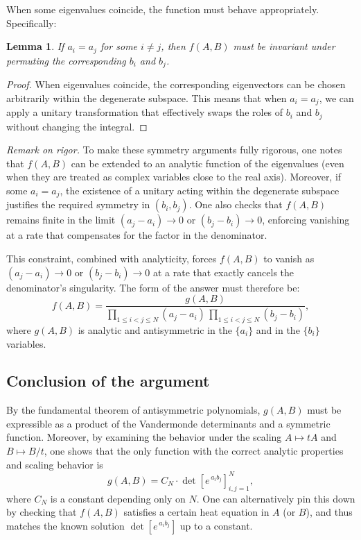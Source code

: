 \documentclass[letterpaper,11pt,oneside,reqno]{book}
\numberwithin{equation}{chapter}  %
\newtheorem{lemma}[proposition]{Lemma}
\theoremstyle{definition}
\begin{document}
When some eigenvalues coincide, the function must behave appropriately. Specifically:
\begin{lemma}
If $a_i = a_j$ for some $i \neq j$, then $f(A,B)$ must be invariant under permuting the corresponding $b_i$ and $b_j$.
\end{lemma}
\begin{proof}
When eigenvalues coincide, the corresponding eigenvectors can be chosen arbitrarily within the degenerate subspace. This means that when $a_i = a_j$, we can apply a unitary transformation that effectively swaps the roles of $b_i$ and $b_j$ without changing the integral.
\end{proof}

\textit{Remark on rigor.}
To make these symmetry arguments fully rigorous, one notes that $f(A,B)$ can be extended to an analytic function of the eigenvalues (even when they are treated as complex variables close to the real axis). Moreover, if some $a_i = a_j$, the existence of a unitary acting within the degenerate subspace justifies the required symmetry in $(b_i,b_j)$. One also checks that $f(A,B)$ remains finite in the limit $(a_j-a_i)\to 0$ or $(b_j-b_i)\to 0$, enforcing vanishing at a rate that compensates for the factor in the denominator.

This constraint, combined with analyticity, forces $f(A,B)$ to vanish as $(a_j-a_i) \to 0$ or $(b_j-b_i) \to 0$ at a rate that exactly cancels the denominator's singularity. The form of the answer must therefore be:
\[
   f(A,B) = \frac{g(A,B)}{\prod_{1\le i<j\le N}(a_j-a_i)\,\prod_{1\le i<j\le N}(b_j-b_i)},
\]
where $g(A,B)$ is analytic and antisymmetric in the $\{a_i\}$ and in the $\{b_i\}$ variables.

\subsection{Conclusion of the argument}

By the fundamental theorem of antisymmetric polynomials, $g(A,B)$ must be expressible as a product of the Vandermonde determinants and a symmetric function. Moreover, by examining the behavior under the scaling $A \mapsto tA$ and $B \mapsto B/t$, one shows that the only function with the correct analytic properties and scaling behavior is
\[
   g(A,B) = C_N \cdot \det[e^{\,a_i b_j}]_{i,j=1}^N,
\]
where $C_N$ is a constant depending only on $N$. One can alternatively pin this down by checking that $f(A,B)$ satisfies a certain heat equation in $A$ (or $B$), and thus matches the known solution $\det[e^{\,a_i b_j}]$ up to a constant.
\end{document}
